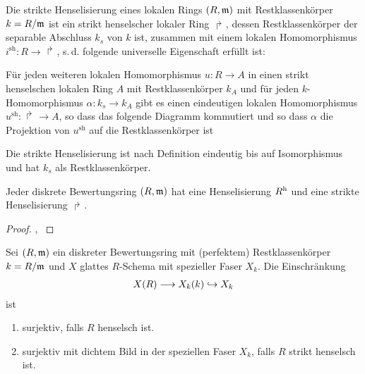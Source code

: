 \documentclass[german]{scrreprt}
\begin{document}
\begin{Definition}\label{def:striktehenselisierung}
  Die strikte Henselisierung eines lokalen Rings $(R,\mathfrak{m})$ mit
  Restklassenkörper $k=R/\mathfrak{m}$ ist ein strikt henselscher lokaler Ring
  $\Rsh$, dessen Restklassenkörper der separable Abschluss $k_s$ von
  $k$ ist, zusammen mit einem lokalen Homomorphismus
  $i^\text{sh}\colon R\to\Rsh$, s.\,d. folgende universelle
  Eigenschaft erfüllt ist:
  
  Für jeden weiteren lokalen Homomorphismus $u\colon R\to A$ in einen
  strikt henselschen lokalen Ring $A$ mit Restklassenkörper $k_A$ und
  für jeden $k$-Homomorphismus $\alpha\colon k_s\to k_A$ gibt es einen
  eindeutigen lokalen Homomorphismus $u^\text{sh}\colon\Rsh\to A$, so
  dass das folgende Diagramm kommutiert und so dass $\alpha$ die
  Projektion von $u^\text{sh}$ auf die Restklassenkörper ist
  \begin{center}
  \end{center}

  Die strikte Henselisierung ist nach Definition eindeutig bis auf
  Isomorphismus und hat $k_s$ als Restklassenkörper.
\end{Definition}

\begin{Satz}\label{thm:exhenselisierung}
  \cite[Proposition IV.6.5]{silverman2}
  Jeder diskrete Bewertungsring $(R,\mathfrak{m})$ hat eine Henselisierung $R^{\text{h}}$
  und eine strikte Henselisierung $\Rsh$.
  \begin{proof}
    \cite[Proposition IV.6.5]{silverman2},
    \cite[Remark IV.6.6.2]{silverman2}
    \cite[Chapter 2.3, S. 48]{neron}
  \end{proof}
\end{Satz}

\begin{Satz}\label{thm:eigstrikthenselsch}
  \cite[Proposition IV.6.4]{silverman2}
  Sei $(R,\mathfrak{m})$ ein diskreter Bewertungsring mit (perfektem)
  Restklassenkörper $k=R/\mathfrak{m}$ und $X$ glattes $R$-Schema mit spezieller
  Faser $X_k$.
  Die Einschränkung
  \begin{gather*}
    X(R)\longrightarrow X_k(k)\hookrightarrow X_k
  \end{gather*}
  ist
  \begin{enumerate}[label=(\roman*)]
  \item surjektiv, falls $R$ henselsch ist.
  \item surjektiv mit dichtem Bild in der speziellen Faser $X_k$,
    falls $R$ strikt henselsch ist.
  \end{enumerate}
\end{Satz}
\end{document}

